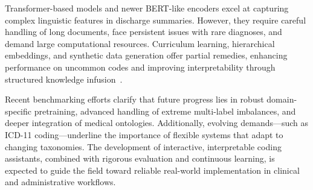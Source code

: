 Transformer-based models and newer BERT-like encoders excel at capturing complex linguistic features in discharge summaries. However, they require careful handling of long documents, face persistent issues with rare diagnoses, and demand large computational resources. Curriculum learning, hierarchical embeddings, and synthetic data generation offer partial remedies, enhancing performance on uncommon codes and improving interpretability through structured knowledge infusion~\citep{ren2022hicu, falis2024gpt35}.

Recent benchmarking efforts clarify that future progress lies in robust domain-specific pretraining, advanced handling of extreme multi-label imbalances, and deeper integration of medical ontologies. Additionally, evolving demands—such as ICD-11 coding—underline the importance of flexible systems that adapt to changing taxonomies. The development of interactive, interpretable coding assistants, combined with rigorous evaluation and continuous learning, is expected to guide the field toward reliable real-world implementation in clinical and administrative workflows.


